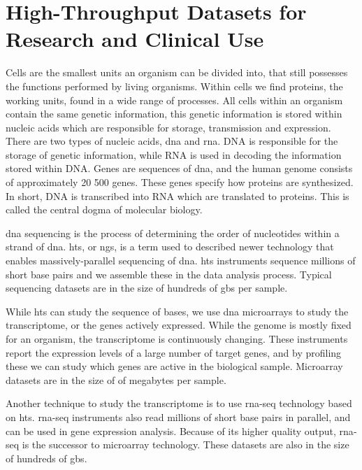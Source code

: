 \section{High-Throughput Datasets for Research and Clinical Use} 
Cells are the smallest units an organism can be divided into, that still
possesses the functions performed by living organisms. Within cells we find
proteins, the working units, found in a wide range of processes.  All cells
within an organism contain the same genetic information, this genetic
information is stored within nucleic acids which are responsible for storage,
transmission and expression. There are two types of nucleic acids, \gls{dna} and
\gls{rna}.  DNA is responsible for the storage of genetic information, while RNA
is used in decoding the information stored within DNA. Genes are sequences of
\gls{dna}, and the human genome consists of approximately 20 500 genes. These
genes specify how proteins are synthesized. In short, DNA is transcribed into
RNA which are translated to proteins. This is called the central dogma of
molecular biology. 

\gls{dna} sequencing is the process of determining the order of nucleotides
within a strand of \gls{dna}. \gls{hts}, or \gls{ngs}, is a term used to
described newer technology that enables massively-parallel sequencing of
\gls{dna}. \gls{hts} instruments sequence millions of short base pairs and
we assemble these in the data analysis process. Typical sequencing datasets are
in the size of hundreds of \glspl{gb} per sample. 

While \gls{hts} can study the sequence of bases, we use \gls{dna} microarrays to
study the transcriptome, or the genes actively expressed. While the genome is
mostly fixed for an organism, the transcriptome is continuously changing. These
instruments report the expression levels of a large number of target genes, and
by profiling these we can study which genes are active in the biological sample.
Microarray datasets are in the size of of megabytes per sample. 

Another technique to study the transcriptome is to use \gls{rna}-seq technology
based on \gls{hts}. \gls{rna}-seq instruments also read millions of short base
pairs in parallel, and can be used in gene expression analysis. Because of its
higher quality output, \gls{rna}-seq is the successor to microarray technology.
These datasets are also in the size of hundreds of \glspl{gb}.

